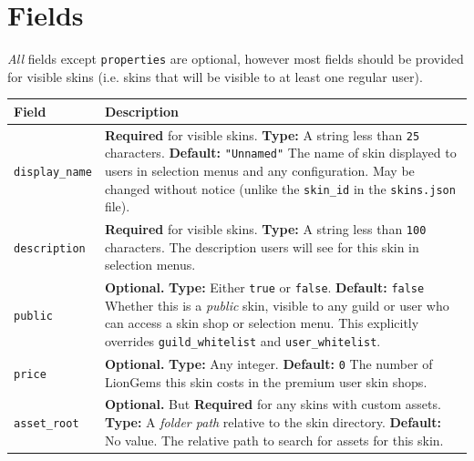 \documentclass[a4paper, 10pt]{report}
\begin{document}
\section{Fields}
\emph{All} fields except \texttt{properties} are optional, however most fields should be provided for visible skins
(i.e. skins that will be visible to at least one regular user).
\renewcommand{\arraystretch}{1.2}
\begin{longtable}{| p{} p{} |}
  \hline
  \rowcolor{gray}
  Field & Description \\ \hline \endfirsthead
  \texttt{display\_name} &
  \textbf{Required} for visible skins.\newline
  \textbf{Type:} A string less than \texttt{25} characters.\newline
  \textbf{Default:} \texttt{"Unnamed"} \newline
  The name of skin displayed to users in selection menus and any configuration.\newline
  May be changed without notice (unlike the \texttt{skin\_id} in the \texttt{skins.json} file).
  \\
  \texttt{description} &
  \textbf{Required} for visible skins.\newline
  \textbf{Type:} A string less than \texttt{100} characters.\newline
  The description users will see for this skin in selection menus.
  \\
  \texttt{public} &
  \textbf{Optional.}\newline
  \textbf{Type:} Either \texttt{true} or \texttt{false}.\newline
  \textbf{Default:} \texttt{false}\newline
  Whether this is a \emph{public} skin, visible to any guild or user who can access a skin shop or selection menu.\newline
  This explicitly overrides \texttt{guild\_whitelist} and \texttt{user\_whitelist}.
  \\
  \texttt{price} &
  \textbf{Optional.}\newline
  \textbf{Type:} Any integer.\newline
  \textbf{Default:} \texttt{0}\newline
  The number of LionGems this skin costs in the premium user skin shops.
  \\
  \texttt{asset\_root} &
  \textbf{Optional.} But \textbf{Required} for any skins with custom assets.\newline
  \textbf{Type:} A \emph{folder path} relative to the skin directory.\newline
  \textbf{Default:} No value.\newline
  The relative path to search for assets for this skin.


\end{longtable}
\end{document}
